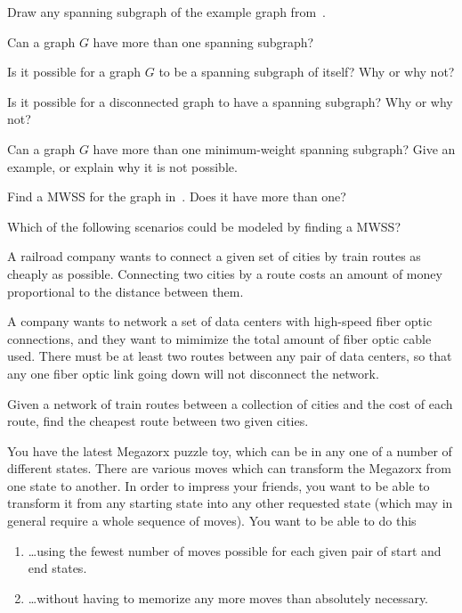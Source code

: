\documentclass{tufte-handout}
\begin{document}
\begin{questions}
\item \label{q:draw-ss} Draw any spanning subgraph of the example
  graph from~.
\item Can a graph $G$ have more than one spanning subgraph?
\item Is it possible for a graph $G$ to be a spanning subgraph of
  itself?  Why or why not?
\item Is it possible for a disconnected graph to have a spanning
  subgraph?  Why or why not?
\item Can a graph $G$ have more than one minimum-weight spanning
  subgraph?  Give an example, or explain why it is not possible.
\item Find a MWSS for the graph in~. Does it have
  more than one?
\item \label{q:scenarios} Which of the following scenarios could be
  modeled by finding a MWSS?
  \begin{subquestions}
  \item A railroad company wants to connect a given set of cities by
    train routes as cheaply as possible. Connecting two cities by a
    route costs an amount of money proportional to the distance
    between them.
  \item A company wants to network a set of data centers with
    high-speed fiber optic connections, and they want to mimimize the
    total amount of fiber optic cable used. There must be at least two
    routes between any pair of data centers, so that any one fiber
    optic link going down will not disconnect the network.
  \item Given a network of train routes between a collection of
    cities and the cost of each route, find the cheapest route between
    two given cities.
  \item You have the latest Megazorx puzzle toy, which can be in any
    one of a number of different states.  There are various moves
    which can transform the Megazorx from one state to another.  In
    order to impress your friends, you want to be able to transform it
    from any starting state into any other requested state (which may
    in general require a whole sequence of moves). You want to be able
    to do this
    \begin{enumerate}[label=(\roman*)]
    \item \dots using the fewest number of moves possible for each
      given pair of start and end states.
    \item \dots without having to memorize any more moves than
      absolutely necessary.
    \end{enumerate}
  \end{subquestions}


\end{questions}
\end{document}

